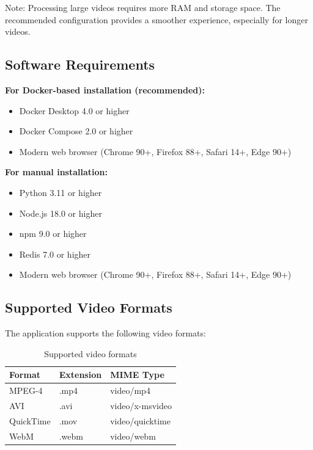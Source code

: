 Note: Processing large videos requires more RAM and storage space. The recommended configuration provides a smoother experience, especially for longer videos.

\subsection{Software Requirements}

\textbf{For Docker-based installation (recommended):}
\begin{itemize}
    \item Docker Desktop 4.0 or higher
    \item Docker Compose 2.0 or higher
    \item Modern web browser (Chrome 90+, Firefox 88+, Safari 14+, Edge 90+)
\end{itemize}

\textbf{For manual installation:}
\begin{itemize}
    \item Python 3.11 or higher
    \item Node.js 18.0 or higher
    \item npm 9.0 or higher
    \item Redis 7.0 or higher
    \item Modern web browser (Chrome 90+, Firefox 88+, Safari 14+, Edge 90+)
\end{itemize}

\subsection{Supported Video Formats}

The application supports the following video formats:

\begin{table}[H]
\centering
\begin{tabular}{|l|l|l|}
\hline
\textbf{Format} & \textbf{Extension} & \textbf{MIME Type} \\
\hline
MPEG-4 & .mp4 & video/mp4 \\
\hline
AVI & .avi & video/x-msvideo \\
\hline
QuickTime & .mov & video/quicktime \\
\hline
WebM & .webm & video/webm \\
\hline
\end{tabular}
\caption{Supported video formats}
\label{tab:video-formats}
\end{table}

